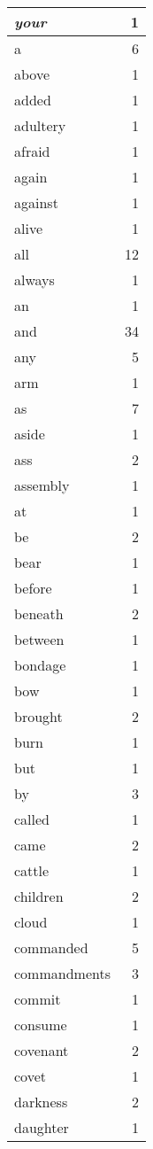 \begin{center}
\begin{longtable}{l|r}
\emph{your} & 1 \\ \hline
a & 6 \\ \hline
above & 1 \\ \hline
added & 1 \\ \hline
adultery & 1 \\ \hline
afraid & 1 \\ \hline
again & 1 \\ \hline
against & 1 \\ \hline
alive & 1 \\ \hline
all & 12 \\ \hline
always & 1 \\ \hline
an & 1 \\ \hline
and & 34 \\ \hline
any & 5 \\ \hline
arm & 1 \\ \hline
as & 7 \\ \hline
aside & 1 \\ \hline
ass & 2 \\ \hline
assembly & 1 \\ \hline
at & 1 \\ \hline
be & 2 \\ \hline
bear & 1 \\ \hline
before & 1 \\ \hline
beneath & 2 \\ \hline
between & 1 \\ \hline
bondage & 1 \\ \hline
bow & 1 \\ \hline
brought & 2 \\ \hline
burn & 1 \\ \hline
but & 1 \\ \hline
by & 3 \\ \hline
called & 1 \\ \hline
came & 2 \\ \hline
cattle & 1 \\ \hline
children & 2 \\ \hline
cloud & 1 \\ \hline
commanded & 5 \\ \hline
commandments & 3 \\ \hline
commit & 1 \\ \hline
consume & 1 \\ \hline
covenant & 2 \\ \hline
covet & 1 \\ \hline
darkness & 2 \\ \hline
daughter & 1 \\ \hline

\end{longtable}
\end{center}
